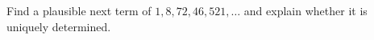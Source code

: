 Find a plausible next term of $1,8,72,46,521,\ldots$ and explain whether it is uniquely determined.
